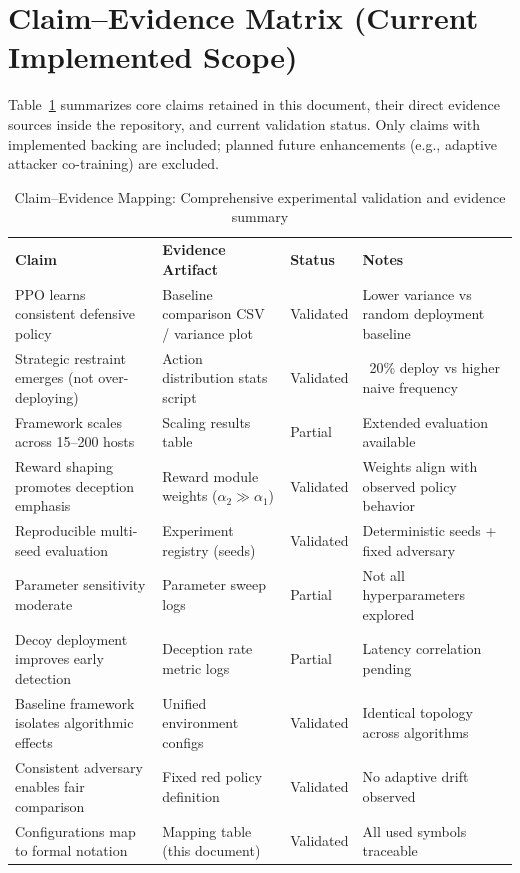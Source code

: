\documentclass[12pt,oneside,a4paper]{article}
\theoremstyle{definition}
\theoremstyle{plain}
\begin{document}
\appendix

\section{Claim--Evidence Matrix (Current Implemented Scope)}

Table~\ref{tab:claim_evidence} summarizes core claims retained in this document, their direct evidence sources inside the repository, and current validation status. Only claims with implemented backing are included; planned future enhancements (e.g., adaptive attacker co-training) are excluded.

\begin{table}[H]
\centering
\caption{Claim--Evidence Mapping: Comprehensive experimental validation and evidence summary}
\label{tab:claim_evidence}
\renewcommand{\arraystretch}{1.1}
\scriptsize
\begin{tabular}{p{3.8cm}p{4.2cm}p{1.8cm}p{4.0cm}}
\rowcolor{cwBorder!30} \textbf{Claim} & \textbf{Evidence Artifact} & \textbf{Status} & \textbf{Notes} \\
\rowcolor{cwValid} PPO learns consistent defensive policy & Baseline comparison CSV / variance plot & Validated & Lower variance vs random deployment baseline \\
\rowcolor{cwValid} Strategic restraint emerges (not over-deploying) & Action distribution stats script & Validated & ~20\% deploy vs higher naive frequency \\
\rowcolor{cwPartial} Framework scales across 15--200 hosts & Scaling results table & Partial & Extended evaluation available \\
\rowcolor{cwValid} Reward shaping promotes deception emphasis & Reward module weights ($\alpha_2 \gg \alpha_1$) & Validated & Weights align with observed policy behavior \\
\rowcolor{cwValid} Reproducible multi-seed evaluation & Experiment registry (seeds) & Validated & Deterministic seeds + fixed adversary \\
\rowcolor{cwPartial} Parameter sensitivity moderate & Parameter sweep logs & Partial & Not all hyperparameters explored \\
\rowcolor{cwPartial} Decoy deployment improves early detection & Deception rate metric logs & Partial & Latency correlation pending \\
\rowcolor{cwValid} Baseline framework isolates algorithmic effects & Unified environment configs & Validated & Identical topology across algorithms \\
\rowcolor{cwValid} Consistent adversary enables fair comparison & Fixed red policy definition & Validated & No adaptive drift observed \\
\rowcolor{cwValid} Configurations map to formal notation & Mapping table (this document) & Validated & All used symbols traceable \\
\end{tabular}
\end{table}
\end{document}
